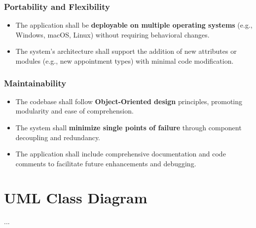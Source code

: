 \subsubsection{Portability and Flexibility}
\begin{itemize}
	\item The application shall be \textbf{deployable on multiple operating systems} (e.g., Windows, macOS, Linux) without requiring behavioral changes.
	\item The system’s architecture shall support the addition of new attributes or modules (e.g., new appointment types) with minimal code modification.
\end{itemize}

\subsubsection{Maintainability}
\begin{itemize}
	\item The codebase shall follow \textbf{Object-Oriented design} principles, promoting modularity and ease of comprehension.
	\item The system shall \textbf{minimize single points of failure} through component decoupling and redundancy.
	\item The application shall include comprehensive documentation and code comments to facilitate future enhancements and debugging.
\end{itemize}

\section{UML Class Diagram}
...